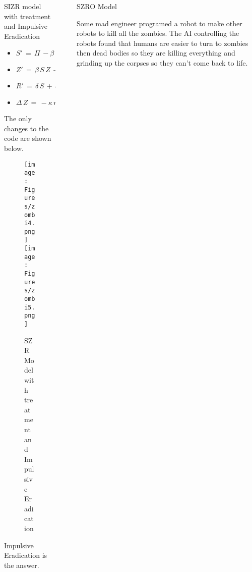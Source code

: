 \documentclass[final]{beamer}
\newlength{\sepwid}
\newlength{\onecolwid}
\newlength{\twocolwid}
\begin{document}
\begin{frame}[t]
\begin{columns}[t]
\begin{column}{\twocolwid}
\begin{columns}[t,totalwidth=\twocolwid]
\begin{column}{\onecolwid}
\begin{block}{ SIZR model with treatment and Impulsive Eradication }
\begin{small}
\begin{itemize}
\item $S'\,=\,\Pi\,-\beta\,S\,Z\,-\,\delta\,S\,\,\,\,t\,!=\,t_n$ 
\item $Z'\,=\,\beta\,S\,Z\,+\,\zeta\,R\,-\,\alpha\,S\,Z\,\,\,\,t\,!=\,t_n$
\item $R'\,=\,\delta\,S\,+\,\alpha\,S\,Z\,-\,\zeta\,R\,\,\,\,t\,!=\,t_n$
\item $\Delta\,Z\,=\,-\kappa\,n\,Z\,\,\,\,t\,=\,t_n$
\end{itemize}
\end{small}


The only changes to the code are shown below.
\begin{tcolorbox}[breakable, title=\textbf{treatment.c}]

\end{tcolorbox}


\begin{tcolorbox}[breakable, title=\textbf{Eradication.c}]

\end{tcolorbox}




\begin{figure}
\texttt{[image: Figures/zombi4.png]}
\texttt{[image: Figures/zombi5.png]}
\caption{ SZR Model with treatment and Impulsive Eradication }
\end{figure}

Impulsive Eradication is the answer.



\end{block}
\end{column} 
\end{columns} 

\end{column}
\begin{column}{\sepwid}\end{column} 

\begin{column}{\onecolwid} 


\begin{block}{ SZRO Model }

Some mad engineer programed a robot to make other robots to kill all the zombies.
The AI controlling the robots found that humans are easier to turn to zombies 
then dead bodies so they are killing everything and grinding up the corpses so they
can't come back to life.


\end{block}
\end{column}
\end{columns}
\end{frame}
\end{document}
